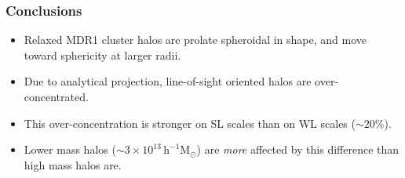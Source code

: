 \documentclass[hyperref={pdfpagelabels=false}]{beamer}
\begin{document}
\begin{frame}
\frametitle{Conclusions}
\begin{block}{}
\begin{itemize}
\item {\large Relaxed MDR1 cluster halos are prolate spheroidal in shape,
  and move toward sphericity at larger radii.}
\item {\large Due to analytical projection, line-of-sight oriented halos are
  over-concentrated.}
\item {\large This over-concentration is stronger on SL scales than on WL scales
  ($\mathrm{\sim 20\%}$).}
\item {\large Lower mass halos {\scriptsize ($\mathrm{\sim 3 \times 10^{13}
        \,h^{-1} M_{\odot}}$)} are {\em more} affected by this difference than 
    high mass halos are.} 
\end{itemize}
\end{block}

\begin{figure}
\end{figure}
\end{frame}
\end{document}
